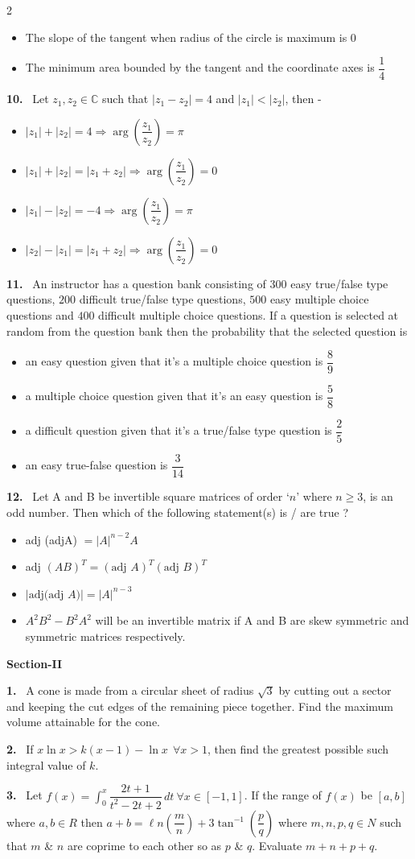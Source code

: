 \documentclass[10pt]{extarticle}
\newcommand{\sect}[1]{\par\smallskip\noindent\textbf{#1}\par}
\newcommand{\qn}[1]{\par\smallskip\noindent\textbf{#1.}~}
\newenvironment{qoptions}{\begin{itemize}[leftmargin=1.8em,itemsep=1pt,topsep=2pt,label={}]}{\end{itemize}}
\newcommand{\opt}[2]{\item[(#1)] #2}
\begin{document}
\begin{multicols}{2}
\begin{qoptions}
\opt{C}{The slope of the tangent when radius of the circle is maximum is $0$}
\opt{D}{The minimum area bounded by the tangent and the coordinate axes is $\dfrac14$}
\end{qoptions}
\qn{10} Let $z_1,z_2\in\mathbb C$ such that $|z_1-z_2|=4$ and $|z_1|<|z_2|$, then -
\begin{qoptions}
\opt{A}{$|z_1|+|z_2|=4\Rightarrow\arg\left(\dfrac{z_1}{z_2}\right)=\pi$}
\opt{B}{$|z_1|+|z_2|=|z_1+z_2|\Rightarrow\arg\left(\dfrac{z_1}{z_2}\right)=0$}
\opt{C}{$|z_1|-|z_2|=-4\Rightarrow\arg\left(\dfrac{z_1}{z_2}\right)=\pi$}
\opt{D}{$|z_2|-|z_1|=|z_1+z_2|\Rightarrow\arg\left(\dfrac{z_1}{z_2}\right)=0$}
\end{qoptions}
\qn{11} An instructor has a question bank consisting of $300$ easy true/false type questions, $200$ difficult true/false type questions, $500$ easy multiple choice questions and $400$ difficult multiple choice questions. If a question is selected at random from the question bank then the probability that the selected question is
\begin{qoptions}
\opt{A}{an easy question given that it's a multiple choice question is $\dfrac89$}
\opt{B}{a multiple choice question given that it's an easy question is $\dfrac58$}
\opt{C}{a difficult question given that it's a true/false type question is $\dfrac25$}
\opt{D}{an easy true-false question is $\dfrac3{14}$}
\end{qoptions}
\qn{12} Let A and B be invertible square matrices of order `$n$' where $n\ge3$, is an odd number. Then which of the following statement(s) is / are true ?
\begin{qoptions}
\opt{A}{adj (adjA) $=|A|^{n-2}A$}
\opt{B}{adj $(AB)^T=(\text{adj }A)^T(\text{adj }B)^T$}
\opt{C}{$|\text{adj(adj }A)|=|A|^{n-3}$}
\opt{D}{$A^2B^2-B^2A^2$ will be an invertible matrix if A and B are skew symmetric and symmetric matrices respectively.}
\end{qoptions}
\sect{Section-II}
\qn{1} A cone is made from a circular sheet of radius $\sqrt3$ by cutting out a sector and keeping the cut edges of the remaining piece together. Find the maximum volume attainable for the cone.
\qn{2} If $x\ln x>k(x-1)-\ln x\ \ \forall x>1$, then find the greatest possible such integral value of $k$.
\qn{3} Let $f(x)=\displaystyle\int_0^x\dfrac{2t+1}{t^2-2t+2}\,dt\ \forall x\in[-1,1]$. If the range of $f(x)$ be $[a,b]$ where $a,b\in R$ then $a+b=\ell n\left(\dfrac mn\right)+3\tan^{-1}\left(\dfrac pq\right)$ where $m,n,p,q\in N$ such that $m$ \& $n$ are coprime to each other so as $p$ \& $q$. Evaluate $m+n+p+q$.

\end{multicols}
\end{document}
